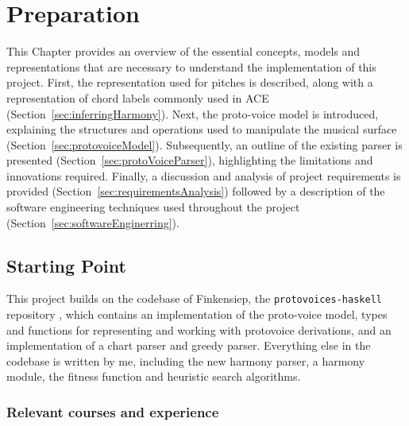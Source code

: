 \documentclass[12pt,a4paper,twoside,openany]{report} \usepackage[pdfborder={0 0 0}]{hyperref}    %
\theoremstyle{definition} \newtheorem{definition}{Definition}[section]
\begin{document}
    \chapter{Preparation}%
    This Chapter provides an overview of the essential concepts, models and representations that are necessary to understand the implementation of this project.
    First, the representation used for pitches is described, along with a representation of chord labels commonly
    used in ACE (Section~\ref{sec:inferringHarmony}).
    Next, the proto-voice model is introduced, explaining the structures and operations used to manipulate the musical surface (Section~\ref{sec:protovoiceModel}). 
    Subsequently, an outline of the existing parser is presented (Section~\ref{sec:protoVoiceParser}), highlighting the limitations and innovations required. 
    Finally, a discussion and analysis of project requirements is provided
    (Section~\ref{sec:requirementsAnalysis}) followed by a description of the software engineering techniques used
    throughout the project (Section~\ref{sec:softwareEnginerring}).

\section{Starting Point}
\label{sec:startingPoint}


This project builds on the codebase of Finkensiep, the \texttt{protovoices-haskell}
repository \cite{finkensiepProtovoicesModelTonal2021}, which contains an implementation 
of the proto-voice model, types and functions for representing and working with protovoice derivations, and an
implementation of a chart parser and greedy parser. Everything else in the codebase is written by me, including the new
harmony parser, a harmony module, the fitness function and heuristic search algorithms.  


\subsection{Relevant courses and experience}
\label{sub:coursesExperience}
\end{document}
